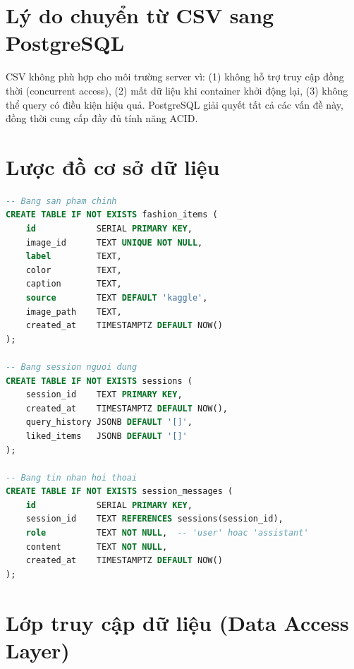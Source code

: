\documentclass[12pt,a4paper]{report}
\begin{document}
\section{Lý do chuyển từ CSV sang PostgreSQL}
\begin{tcolorbox}[title=Lưu ý]
CSV không phù hợp cho môi trường server vì: (1) không hỗ trợ truy cập đồng thời (concurrent access), (2) mất dữ liệu khi container khởi động lại, (3) không thể query có điều kiện hiệu quả. PostgreSQL giải quyết tất cả các vấn đề này, đồng thời cung cấp đầy đủ tính năng ACID.
\end{tcolorbox}

\section{Lược đồ cơ sở dữ liệu}

\begin{lstlisting}[language=SQL,caption={Schema PostgreSQL cho Fashion Agent}]
-- Bang san pham chinh
CREATE TABLE IF NOT EXISTS fashion_items (
    id            SERIAL PRIMARY KEY,
    image_id      TEXT UNIQUE NOT NULL,
    label         TEXT,
    color         TEXT,
    caption       TEXT,
    source        TEXT DEFAULT 'kaggle',
    image_path    TEXT,
    created_at    TIMESTAMPTZ DEFAULT NOW()
);

-- Bang session nguoi dung
CREATE TABLE IF NOT EXISTS sessions (
    session_id    TEXT PRIMARY KEY,
    created_at    TIMESTAMPTZ DEFAULT NOW(),
    query_history JSONB DEFAULT '[]',
    liked_items   JSONB DEFAULT '[]'
);

-- Bang tin nhan hoi thoai
CREATE TABLE IF NOT EXISTS session_messages (
    id            SERIAL PRIMARY KEY,
    session_id    TEXT REFERENCES sessions(session_id),
    role          TEXT NOT NULL,  -- 'user' hoac 'assistant'
    content       TEXT NOT NULL,
    created_at    TIMESTAMPTZ DEFAULT NOW()
);
\end{lstlisting}

\section{Lớp truy cập dữ liệu (Data Access Layer)}
\end{document}
